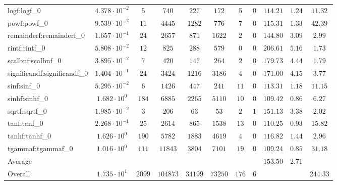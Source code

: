 \begin{tabular}{|l|c|c|c|c|c|c|c|c|c|c|}
logf:logf\_0                 & $ 4.378 \cdot 10^{-2} $ & $ 5      $ & $ 740    $ & $ 227   $ & $ 172   $ & $ 5   $ & $ 0 $ & $ 114.21      $ & $ 1.24    $ & $ 11.32   $ \\
powf:powf\_0                 & $ 9.539 \cdot 10^{-2} $ & $ 11     $ & $ 4445   $ & $ 1282  $ & $ 776   $ & $ 7   $ & $ 0 $ & $ 115.31      $ & $ 1.33    $ & $ 42.39   $ \\
remainderf:remainderf\_0     & $ 1.657 \cdot 10^{-1} $ & $ 24     $ & $ 2657   $ & $ 871   $ & $ 1622  $ & $ 2   $ & $ 0 $ & $ 144.80      $ & $ 3.09    $ & $ 2.99    $ \\
rintf:rintf\_0               & $ 5.808 \cdot 10^{-2} $ & $ 12     $ & $ 825    $ & $ 288   $ & $ 579   $ & $ 0   $ & $ 0 $ & $ 206.61      $ & $ 5.16    $ & $ 1.73    $ \\
scalbnf:scalbnf\_0           & $ 3.895 \cdot 10^{-2} $ & $ 7      $ & $ 420    $ & $ 147   $ & $ 264   $ & $ 2   $ & $ 0 $ & $ 179.73      $ & $ 4.44    $ & $ 1.79    $ \\
significandf:significandf\_0 & $ 1.404 \cdot 10^{-1} $ & $ 24     $ & $ 3424   $ & $ 1216  $ & $ 3186  $ & $ 4   $ & $ 0 $ & $ 171.00      $ & $ 4.15    $ & $ 3.77    $ \\
sinf:sinf\_0                 & $ 5.295 \cdot 10^{-2} $ & $ 6      $ & $ 1426   $ & $ 447   $ & $ 241   $ & $ 11  $ & $ 0 $ & $ 113.31      $ & $ 1.18    $ & $ 11.15   $ \\
sinhf:sinhf\_0               & $ 1.682 \cdot 10^{0}  $ & $ 184    $ & $ 6885   $ & $ 2265  $ & $ 5110  $ & $ 10  $ & $ 0 $ & $ 109.42      $ & $ 0.86    $ & $ 6.27    $ \\
sqrtf:sqrtf\_0               & $ 1.985 \cdot 10^{-2} $ & $ 3      $ & $ 206    $ & $ 63    $ & $ 53    $ & $ 2   $ & $ 1 $ & $ 151.13      $ & $ 3.38    $ & $ 2.02    $ \\
tanf:tanf\_0                 & $ 2.268 \cdot 10^{-1} $ & $ 25     $ & $ 2614   $ & $ 865   $ & $ 1538  $ & $ 13  $ & $ 0 $ & $ 110.25      $ & $ 0.93    $ & $ 15.82   $ \\
tanhf:tanhf\_0               & $ 1.626 \cdot 10^{0}  $ & $ 190    $ & $ 5782   $ & $ 1883  $ & $ 4619  $ & $ 4   $ & $ 0 $ & $ 116.82      $ & $ 1.44    $ & $ 2.96    $ \\
tgammaf:tgammaf\_0           & $ 1.016 \cdot 10^{0}  $ & $ 111    $ & $ 11843  $ & $ 3804  $ & $ 7101  $ & $ 19  $ & $ 0 $ & $ 109.24      $ & $ 0.85    $ & $ 31.18   $ \\
\hline
Average                      & $                     $ & $        $ & $        $ & $       $ & $       $ & $     $ & $   $ & $ 153.50      $ & $ 2.71    $ & $         $ \\
\hline
Overall                      & $ 1.735 \cdot 10^{1}  $ & $ 2099   $ & $ 104873 $ & $ 34199 $ & $ 73250 $ & $ 176 $ & $ 6 $ & $             $ & $         $ & $ 244.33  $ \\
\hline
\end{tabular}
